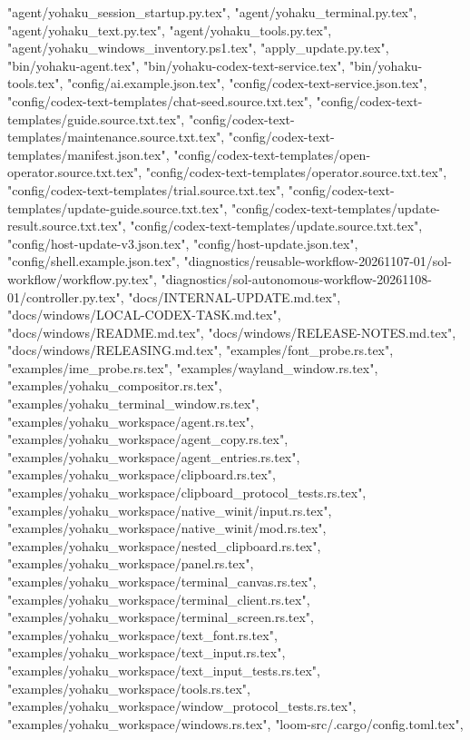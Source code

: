 {    "agent/yohaku_session_startup.py.tex",
    "agent/yohaku_terminal.py.tex",
    "agent/yohaku_text.py.tex",
    "agent/yohaku_tools.py.tex",
    "agent/yohaku_windows_inventory.ps1.tex",
    "apply_update.py.tex",
    "bin/yohaku-agent.tex",
    "bin/yohaku-codex-text-service.tex",
    "bin/yohaku-tools.tex",
    "config/ai.example.json.tex",
    "config/codex-text-service.json.tex",
    "config/codex-text-templates/chat-seed.source.txt.tex",
    "config/codex-text-templates/guide.source.txt.tex",
    "config/codex-text-templates/maintenance.source.txt.tex",
    "config/codex-text-templates/manifest.json.tex",
    "config/codex-text-templates/open-operator.source.txt.tex",
    "config/codex-text-templates/operator.source.txt.tex",
    "config/codex-text-templates/trial.source.txt.tex",
    "config/codex-text-templates/update-guide.source.txt.tex",
    "config/codex-text-templates/update-result.source.txt.tex",
    "config/codex-text-templates/update.source.txt.tex",
    "config/host-update-v3.json.tex",
    "config/host-update.json.tex",
    "config/shell.example.json.tex",
    "diagnostics/reusable-workflow-20261107-01/sol-workflow/workflow.py.tex",
    "diagnostics/sol-autonomous-workflow-20261108-01/controller.py.tex",
    "docs/INTERNAL-UPDATE.md.tex",
    "docs/windows/LOCAL-CODEX-TASK.md.tex",
    "docs/windows/README.md.tex",
    "docs/windows/RELEASE-NOTES.md.tex",
    "docs/windows/RELEASING.md.tex",
    "examples/font_probe.rs.tex",
    "examples/ime_probe.rs.tex",
    "examples/wayland_window.rs.tex",
    "examples/yohaku_compositor.rs.tex",
    "examples/yohaku_terminal_window.rs.tex",
    "examples/yohaku_workspace/agent.rs.tex",
    "examples/yohaku_workspace/agent_copy.rs.tex",
    "examples/yohaku_workspace/agent_entries.rs.tex",
    "examples/yohaku_workspace/clipboard.rs.tex",
    "examples/yohaku_workspace/clipboard_protocol_tests.rs.tex",
    "examples/yohaku_workspace/native_winit/input.rs.tex",
    "examples/yohaku_workspace/native_winit/mod.rs.tex",
    "examples/yohaku_workspace/nested_clipboard.rs.tex",
    "examples/yohaku_workspace/panel.rs.tex",
    "examples/yohaku_workspace/terminal_canvas.rs.tex",
    "examples/yohaku_workspace/terminal_client.rs.tex",
    "examples/yohaku_workspace/terminal_screen.rs.tex",
    "examples/yohaku_workspace/text_font.rs.tex",
    "examples/yohaku_workspace/text_input.rs.tex",
    "examples/yohaku_workspace/text_input_tests.rs.tex",
    "examples/yohaku_workspace/tools.rs.tex",
    "examples/yohaku_workspace/window_protocol_tests.rs.tex",
    "examples/yohaku_workspace/windows.rs.tex",
    "loom-src/.cargo/config.toml.tex",
}
